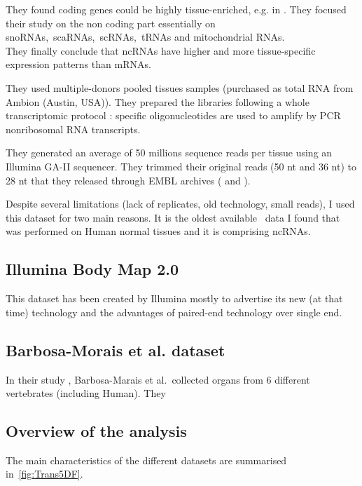 They found coding genes could be highly tissue-enriched, e.g. 
in . They focused their study on the non coding part essentially
on \glspl{snoRNA},~\glspl{scaRNA},~\glspl{scRNA},~\glspl{tRNA} and mitochondrial
\glspl{RNA}.\\
They finally conclude that \glspl{ncRNA} have higher and more tissue-specific
expression patterns than \glspl{mRNA}.

They used multiple-donors pooled tissues samples (purchased as total \gls{RNA}
from Ambion (Austin, USA)).
They prepared the libraries following a whole transcriptomic protocol \citep{Armour:2009}:
specific oligonucleotides are used to amplify by \gls{PCR} nonribosomal \gls{RNA}
transcripts.

They generated an average of 50 millions sequence reads per tissue
using an Illumina GA-II sequencer. They trimmed their original reads (50 \gls{nt}
and 36 \gls{nt}) to 28 \gls{nt} that they released through EMBL archives (
and ).

Despite several limitations (lack of replicates, old technology, small reads),
I used this dataset for two main reasons. It is the oldest available \Rnaseq\
data I found that was performed on Human normal tissues and it is comprising
\glspl{ncRNA}.


\subsection{Illumina Body Map 2.0}

This dataset has been created by Illumina mostly to advertise its new (at that time)
technology and the advantages of paired-end technology over single end.
\citep{illuminaBM}

\subsection{Barbosa-Morais et al. dataset}

In their study ,\citet*{VTpaper} Barbosa-Marais et al.\
collected organs from 6 different vertebrates (including Human). They 


\subsection{Overview of the analysis}

The main characteristics of the different datasets are summarised
in~\cref{fig:Trans5DF}.

